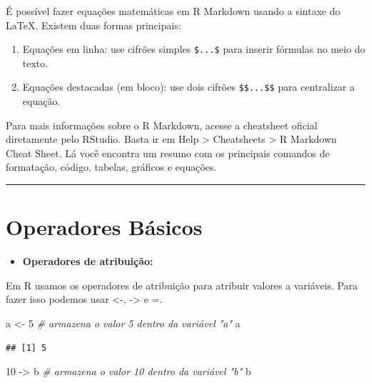 \documentclass[
]{book}
\newenvironment{Shaded}{\begin{snugshade}}{\end{snugshade}}
\newcommand{\CommentTok}[1]{\textcolor[rgb]{0.56,0.35,0.01}{\textit{#1}}}
\newcommand{\DecValTok}[1]{\textcolor[rgb]{0.00,0.00,0.81}{#1}}
\newcommand{\NormalTok}[1]{#1}
\newcommand{\OtherTok}[1]{\textcolor[rgb]{0.56,0.35,0.01}{#1}}
\providecommand{\tightlist}{%
  \setlength{\itemsep}{0pt}\setlength{\parskip}{0pt}}
\begin{document}
É possível fazer equações matemáticas em R Markdown usando a sintaxe do LaTeX. Existem duas formas principais:

\begin{enumerate}
\def\labelenumi{\arabic{enumi}.}
\tightlist
\item
  Equações em linha: use cifrões simples \texttt{\$...\$} para inserir fórmulas no meio do texto.
\item
  Equações destacadas (em bloco): use dois cifrões \texttt{\$\$...\$\$} para centralizar a equação.
\end{enumerate}

Para mais informações sobre o R Markdown, acesse a cheatsheet oficial diretamente pelo RStudio.
Basta ir em Help \textgreater{} Cheatsheets \textgreater{} R Markdown Cheat Sheet.
Lá você encontra um resumo com os principais comandos de formatação, código, tabelas, gráficos e equações.

\begin{center}\rule{0.5\linewidth}{0.5pt}\end{center}

\section{Operadores Básicos}\label{operadores-buxe1sicos}

\begin{itemize}
\tightlist
\item
  \textbf{Operadores de atribuição:}
\end{itemize}

Em R usamos os operadores de atribuição para atribuir valores a variáveis. Para fazer isso podemos usar \textless-, -\textgreater{} e =.

\begin{Shaded}
\begin{Highlighting}[]
\NormalTok{a }\OtherTok{\textless{}{-}} \DecValTok{5} \CommentTok{\# armazena o valor 5 dentro da variável "a"}
\NormalTok{a}
\end{Highlighting}
\end{Shaded}

\begin{verbatim}
## [1] 5
\end{verbatim}

\begin{Shaded}
\begin{Highlighting}[]
\DecValTok{10} \OtherTok{{-}\textgreater{}}\NormalTok{ b }\CommentTok{\# armazena o valor 10 dentro da variável "b"}
\NormalTok{b}
\end{Highlighting}
\end{Shaded}
\end{document}
